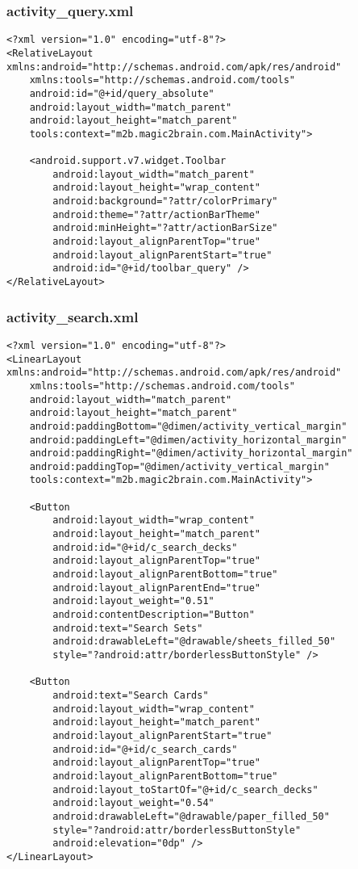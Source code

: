 \subsubsection*{activity\_query.xml}
\begin{lstlisting}
<?xml version="1.0" encoding="utf-8"?>
<RelativeLayout xmlns:android="http://schemas.android.com/apk/res/android"
    xmlns:tools="http://schemas.android.com/tools"
    android:id="@+id/query_absolute"
    android:layout_width="match_parent"
    android:layout_height="match_parent"
    tools:context="m2b.magic2brain.com.MainActivity">

    <android.support.v7.widget.Toolbar
        android:layout_width="match_parent"
        android:layout_height="wrap_content"
        android:background="?attr/colorPrimary"
        android:theme="?attr/actionBarTheme"
        android:minHeight="?attr/actionBarSize"
        android:layout_alignParentTop="true"
        android:layout_alignParentStart="true"
        android:id="@+id/toolbar_query" />
</RelativeLayout>
\end{lstlisting}

\subsubsection*{activity\_search.xml}
\begin{lstlisting}
<?xml version="1.0" encoding="utf-8"?>
<LinearLayout xmlns:android="http://schemas.android.com/apk/res/android"
    xmlns:tools="http://schemas.android.com/tools"
    android:layout_width="match_parent"
    android:layout_height="match_parent"
    android:paddingBottom="@dimen/activity_vertical_margin"
    android:paddingLeft="@dimen/activity_horizontal_margin"
    android:paddingRight="@dimen/activity_horizontal_margin"
    android:paddingTop="@dimen/activity_vertical_margin"
    tools:context="m2b.magic2brain.com.MainActivity">

    <Button
        android:layout_width="wrap_content"
        android:layout_height="match_parent"
        android:id="@+id/c_search_decks"
        android:layout_alignParentTop="true"
        android:layout_alignParentBottom="true"
        android:layout_alignParentEnd="true"
        android:layout_weight="0.51"
        android:contentDescription="Button"
        android:text="Search Sets"
        android:drawableLeft="@drawable/sheets_filled_50"
        style="?android:attr/borderlessButtonStyle" />

    <Button
        android:text="Search Cards"
        android:layout_width="wrap_content"
        android:layout_height="match_parent"
        android:layout_alignParentStart="true"
        android:id="@+id/c_search_cards"
        android:layout_alignParentTop="true"
        android:layout_alignParentBottom="true"
        android:layout_toStartOf="@+id/c_search_decks"
        android:layout_weight="0.54"
        android:drawableLeft="@drawable/paper_filled_50"
        style="?android:attr/borderlessButtonStyle"
        android:elevation="0dp" />
</LinearLayout>
\end{lstlisting}

